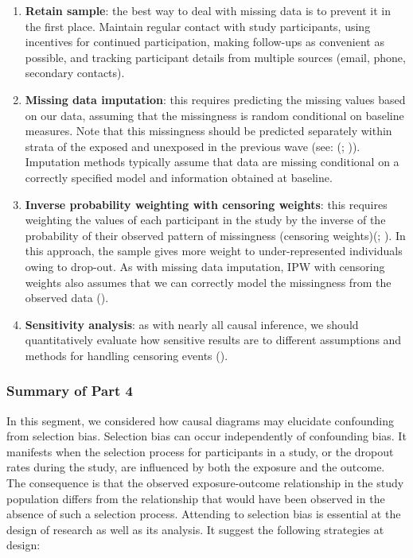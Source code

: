 \documentclass[
  singlecolumn]{article}
\begin{document}
\begin{enumerate}
\def\labelenumi{\arabic{enumi}.}
\item
  \textbf{Retain sample}: the best way to deal with missing data is to
  prevent it in the first place. Maintain regular contact with study
  participants, using incentives for continued participation, making
  follow-ups as convenient as possible, and tracking participant details
  from multiple sources (email, phone, secondary contacts).
\item
  \textbf{Missing data imputation}: this requires predicting the missing
  values based on our data, assuming that the missingness is random
  conditional on baseline measures. Note that this missingness should be
  predicted separately within strata of the exposed and unexposed in the
  previous wave (see: (; )).
  Imputation methods typically assume that data are missing conditional
  on a correctly specified model and information obtained at baseline.
\item
  \textbf{Inverse probability weighting with censoring weights}: this
  requires weighting the values of each participant in the study by the
  inverse of the probability of their observed pattern of missingness
  (censoring weights)(;
  ). In this
  approach, the sample gives more weight to under-represented
  individuals owing to drop-out. As with missing data imputation, IPW
  with censoring weights also assumes that we can correctly model the
  missingness from the observed data ().
\item
  \textbf{Sensitivity analysis}: as with nearly all causal inference, we
  should quantitatively evaluate how sensitive results are to different
  assumptions and methods for handling censoring events
  ().
\end{enumerate}

\subsubsection{Summary of Part 4}\label{summary-of-part-4}

In this segment, we considered how causal diagrams may elucidate
confounding from selection bias. Selection bias can occur independently
of confounding bias. It manifests when the selection process for
participants in a study, or the dropout rates during the study, are
influenced by both the exposure and the outcome. The consequence is that
the observed exposure-outcome relationship in the study population
differs from the relationship that would have been observed in the
absence of such a selection process. Attending to selection bias is
essential at the design of research as well as its analysis. It suggest
the following strategies at design:
\end{document}
